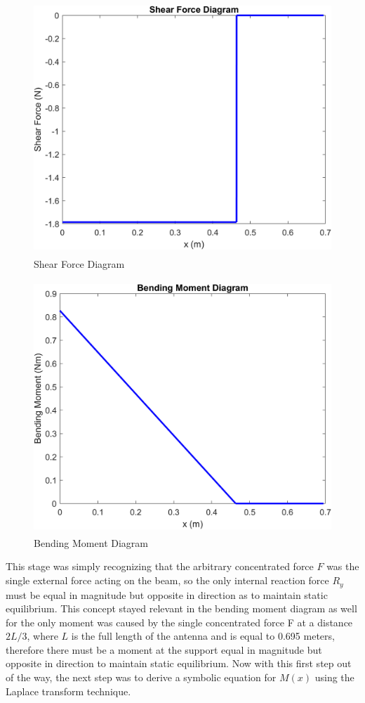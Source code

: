 \documentclass[12pt]{article}
\begin{document}
\begin{figure}[H]
\centering
\includegraphics[height= 9.5cm, width= 12.5cm]{curve_Shear_Force.png}
\caption{Shear Force Diagram}
\label{Figure 2}
\end{figure}

\begin{figure}[H]
\centering
\includegraphics[height= 9.5cm, width= 12.5cm]{curve_Bending_Moment.png}
\caption{Bending Moment Diagram}
\label{Figure 3}
\end{figure}

\setlength{\parindent}{0cm}
This stage was simply recognizing that the arbitrary concentrated force $F$ was the single external force acting on the beam, so the only internal reaction force $R_y$ must be equal in magnitude but opposite in direction as to maintain static equilibrium. This concept stayed relevant in the bending moment diagram as well for the only moment was caused by the single concentrated force F at a distance $2L/3$, where $L$ is the full length of the antenna and is equal to 0.695 meters, therefore there must be a moment at the support equal in magnitude but opposite in direction to maintain static equilibrium. Now with this first step out of the way, the next step was to derive a symbolic equation for $M(x)$ using the Laplace transform technique. 
\end{document}
